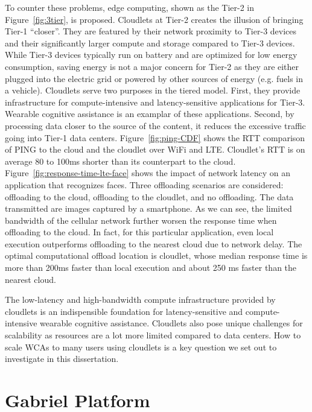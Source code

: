 To counter these problems, edge computing, shown as the Tier-2 in
Figure~\ref{fig:3tier}, is proposed. Cloudlets at Tier-2 creates the illusion of
bringing Tier-1 ``closer''. They are featured by their network proximity to
Tier-3 devices and their significantly larger compute and storage compared to
Tier-3 devices. While Tier-3 devices typically run on battery and are optimized
for low energy consumption, saving energy is not a major concern for Tier-2 as
they are either plugged into the electric grid or powered by other sources of
energy (e.g. fuels in a vehicle). Cloudlets serve two purposes in the tiered
model. First, they provide infrastructure for compute-intensive and
latency-sensitive applications for Tier-3. Wearable cognitive assistance is an
examplar of these applications. Second, by processing data closer to the source
of the content, it reduces the excessive traffic going into Tier-1 data centers.
Figure~\ref{fig:ping-CDF} shows the RTT comparison of PING to the cloud and the
cloudlet over WiFi and LTE. Cloudlet's RTT is on average 80 to 100ms shorter
than its counterpart to the cloud. Figure~\ref{fig:response-time-lte-face} shows
the impact of network latency on an application that recognizes faces. Three
offloading scenarios are considered: offloading to the cloud, offloading to the
cloudlet, and no offloading. The data transmitted are images captured by a
smartphone. As we can see, the limited bandwidth of the cellular network further
worsen the response time when offloading to the cloud. In fact, for this
particular application, even local execution outperforms offloading to the
nearest cloud due to network delay. The optimal computational offload location
is cloudlet, whose median response time is more than 200ms faster than local
execution and about 250 ms faster than the nearest cloud.

The low-latency and high-bandwidth compute infrastructure provided by cloudlets
is an indispensible foundation for latency-sensitive and compute-intensive
wearable cognitive assistance. Cloudlets also pose unique challenges for
scalability as resources are a lot more limited compared to data centers. How to
scale WCAs to many users using cloudlets is a key question we set out to
investigate in this dissertation. 


\section{Gabriel Platform}
\label{sec: bg-gabriel}

